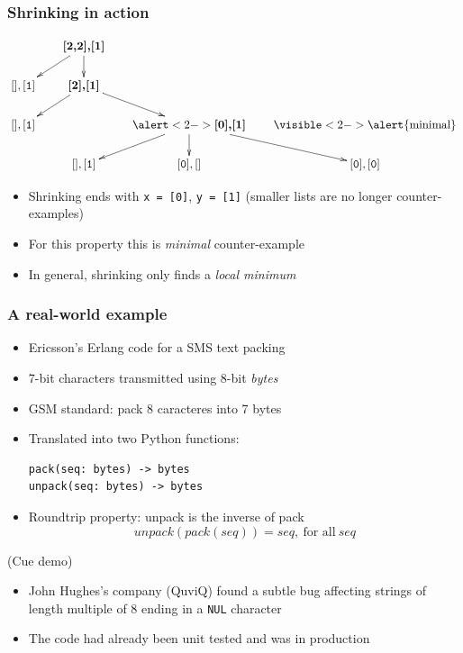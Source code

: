 \documentclass{beamer}
\newcommand{\bs}{\symbol{92}}
\newcommand{\counter}[1]{\textbf{#1}}
\newcommand{\noncounter}[1]{{\mathtt{#1}}}
\begin{document}
\begin{frame}
\frametitle{Shrinking in action}

\[ \xymatrix@-0.5pc{
 & \counter{[2,2],[1]}\ar[dl]\ar[d] \\
 \noncounter{[],[1]} &  \counter{[2],[1]}\ar[dl]\ar[dr] \\
 \noncounter{[],[1]} & &\alert<2->{\counter{[0],[1]}}\ar[dl]\ar[d]\ar[dr]
 &  \visible<2->{\alert{\text{minimal}}} \\
&  \noncounter{[],[1]} & \noncounter{[0],[]} & \noncounter{[0],[0]}
} 
\]

\begin{itemize}
\item Shrinking ends with  \texttt{x = [0]}, \texttt{y = [1]}
  (smaller lists are no longer counter-examples)
\item For this property this is \emph{minimal} counter-example
\item In general, shrinking only finds a \emph{local minimum}
\end{itemize}
\end{frame}

\begin{frame}
  \frametitle{A real-world example}
  \begin{itemize}
  \item Ericsson's Erlang code for a SMS text packing
  \item 7-bit characters transmitted using 8-bit \emph{bytes}
  \item GSM standard: pack 8 caracteres into 7 bytes
\item Translated into two Python functions:
\begin{verbatim}
pack(seq: bytes) -> bytes
unpack(seq: bytes) -> bytes
\end{verbatim}
\item Roundtrip property: unpack is the inverse of pack
  \[ unpack(pack(seq)) = seq, ~\text{for all}~ seq \]
\end{itemize}
\bigskip
\hfill (Cue demo)

\framebreak

  \begin{itemize}
  \item John Hughes's company (QuviQ) found a subtle bug 
    affecting strings of length multiple of 8
    ending in a \texttt{\bs NUL} character
  \item The code had already been unit tested and
    was in production
  \end{itemize}
\end{frame}
\end{document}
